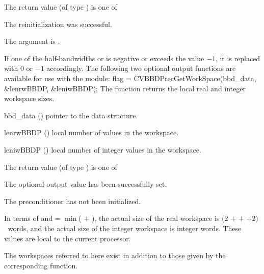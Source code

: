 {
  The return value  (of type ) is one of
  \begin{args}
  \item[\Id{CVBBDPRE\_SUCCESS}]
    The reinitialization was successful.
  \item[\Id{CVBBDPRE\_PDATA\_NULL}] 
    The  argument is .
  \end{args}
}
{
  If one of the half-bandwidths  or  is negative or
  exceeds the value $-1$, it is replaced with 0 or
  $-1$ accordingly.
}
The following two optional output functions are available for use with
the {\cvbbdpre} module:
{
  flag = CVBBDPrecGetWorkSpace(bbd\_data, \&lenrwBBDP, \&leniwBBDP);
}
{
  The function  returns the local
  {\cvbbdpre} real and integer workspace sizes.
}
{
  \begin{args}[lenrwBBDP]
  \item[bbd\_data] ()
    pointer to the {\cvbbdpre} data structure.
  \item[lenrwBBDP] ()
    local number of  values in the {\cvbbdpre} workspace.
  \item[leniwBBDP] ()
    local number of integer values in the {\cvbbdpre} workspace.
  \end{args}
}
{
  The return value  (of type ) is one of
  \begin{args}
  \item[\Id{CVBBDPRE\_SUCCESS}] 
    The optional output value has been successfully set.
  \item[\Id{CVBBDPRE\_PDATA\_NULL}]
    The {\cvbbdpre} preconditioner has not been initialized.
  \end{args}
}
{
  In terms of  and
   = $\min$( $+$ ),
  the actual size of the real workspace is
  (2  $+$  $+$  $+2) \, $ $~$
   words, and the actual size of the integer workspace is
   integer words.  These values are local to the current processor.

  The workspaces referred to here exist in addition to those given by the
  corresponding  function.
}
